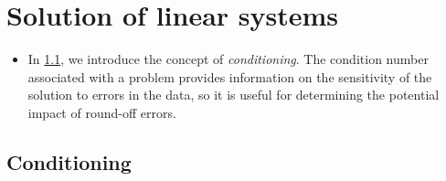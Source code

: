 \chapter{Solution of linear systems}
\label{cha:solution_of_linear_systems}


\begin{itemize}
    \item 
        In \cref{sec:conditioning},
        we introduce the concept of \emph{conditioning}.
        The condition number associated with a problem provides information on the sensitivity of the solution to errors in the data,
        so it is useful for determining the potential impact of round-off errors.
\end{itemize}

\section{Conditioning}%
\label{sec:conditioning}

